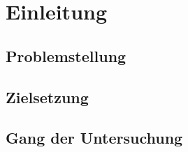 \newpage
\section{Einleitung}

\subsection{Problemstellung}

\subsection{Zielsetzung}

\subsection{Gang der Untersuchung}
